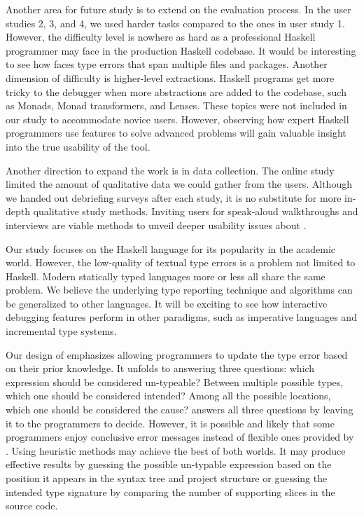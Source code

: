 Another area for future study is to extend on the evaluation process. In the user studies 2, 3, and 4, we used harder tasks compared to the ones in user study 1. However, the difficulty level is nowhere as hard as a professional Haskell programmer may face in the production Haskell codebase. It would be interesting to see how \chameleon{}  faces type errors that span multiple files and packages. Another dimension of difficulty is higher-level extractions. Haskell programs get more tricky to the debugger when more abstractions are added to the codebase, such as Monads, Monad transformers, and Lenses. These topics were not included in our study to accommodate novice users. However, observing how expert Haskell programmers use \chameleon{} features to solve advanced problems will gain valuable insight into the true usability of the tool.

Another direction to expand the work is in data collection. The online study limited the amount of qualitative data we could gather from the users. Although we handed out debriefing surveys after each study, it is no substitute for more in-depth qualitative study methods. Inviting users for speak-aloud walkthroughs and interviews are viable methods to unveil deeper usability issues about \chameleon{}.

Our study focuses on the Haskell language for its popularity in the academic world. However, the low-quality of textual type errors is a problem not limited to Haskell. Modern statically typed languages more or less all share the same problem. We believe the underlying type reporting technique and algorithms can be generalized to other languages. It will be exciting to see how interactive debugging features perform in other paradigms, such as  imperative languages and incremental type systems.

Our design of \chameleon{}  emphasizes allowing programmers to update the type error based on their prior knowledge. It unfolds to answering three questions: which expression should be considered un-typeable? Between multiple possible types, which one should be considered intended? Among all the possible locations, which one should be considered the cause? \chameleon{} answers all three questions by leaving it to the programmers to decide. However, it is possible and likely that some programmers enjoy conclusive error messages instead of flexible ones provided by \chameleon{}. Using heuristic methods may achieve the best of both worlds. It may produce effective results by guessing the possible un-typable expression based on the position it appears in the syntax tree and project structure or guessing the intended type signature by comparing the number of supporting slices in the source code.
